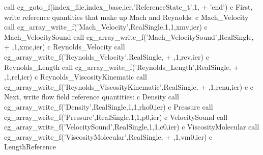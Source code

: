 \documentclass[12pt]{article}
\begin{document}
{\newline\indent      call cg\_goto\_f(index\_file,index\_base,ier,'ReferenceState\_t',1,
\newline + \indent  'end')
\newline c   First, write reference quantities that make up Mach and Reynolds:
\newline c   Mach\_Velocity
\newline\indent      call cg\_array\_write\_f('Mach\_Velocity',RealSingle,1,1,xmv,ier)
\newline c   Mach\_VelocitySound
\newline\indent      call cg\_array\_write\_f('Mach\_VelocitySound',RealSingle,
\newline + ,1,xmc,ier)
\newline c   Reynolds\_Velocity
\newline\indent      call cg\_array\_write\_f('Reynolds\_Velocity',RealSingle,
\newline + ,1,rev,ier)
\newline c   Reynolds\_Length
\newline\indent      call cg\_array\_write\_f('Reynolds\_Length',RealSingle,
\newline + ,1,rel,ier)
\newline c   Reynolds\_ViscosityKinematic
\newline\indent      call cg\_array\_write\_f('Reynolds\_ViscosityKinematic',RealSingle,
\newline + ,1,renu,ier)
\newline c
\newline c   Next, write flow field reference quantities:
\newline c   Density
\newline\indent      call cg\_array\_write\_f('Density',RealSingle,1,1,rho0,ier)
\newline c   Pressure
\newline\indent      call cg\_array\_write\_f('Pressure',RealSingle,1,1,p0,ier)
\newline c   VelocitySound
\newline\indent      call cg\_array\_write\_f('VelocitySound',RealSingle,1,1,c0,ier)
\newline c   ViscosityMolecular
\newline\indent      call cg\_array\_write\_f('ViscosityMolecular',RealSingle,
\newline + ,1,vm0,ier)
\newline c   LengthReference
}
\end{document}
